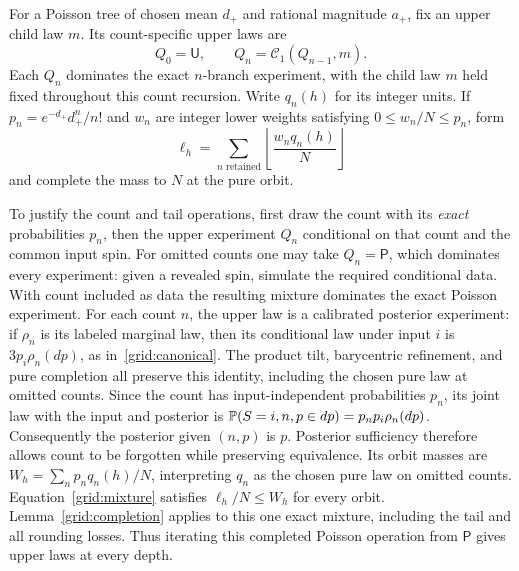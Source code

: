 For a Poisson tree of chosen mean $d_+$ and rational magnitude $a_+$,
fix an upper child law $m$.  Its count-specific upper laws are
\begin{equation}
 Q_0=\mathsf U,\qquad Q_n=\mathcal C_1(Q_{n-1},m).
 \label{grid:counts}
\end{equation}
Each $Q_n$ dominates the exact $n$-branch experiment, with the child law
$m$ held fixed throughout this count recursion.  Write $q_n(h)$ for its
integer units.  If $p_n=e^{-d_+}d_+^n/n!$ and $w_n$ are integer lower
weights satisfying $0\leq w_n/N\leq p_n$, form
\begin{equation}
 \ell_h=\sum_{n\text{ retained}}
          \left\lfloor\frac{w_nq_n(h)}N\right\rfloor
 \label{grid:mixture}
\end{equation}
and complete the mass to $N$ at the pure orbit.

To justify the count and tail operations, first draw the count with
its \emph{exact} probabilities $p_n$, then the upper experiment $Q_n$
conditional on that count and the common input spin.  For omitted counts
one may take $Q_n=\mathsf P$, which dominates every experiment: given a
revealed spin, simulate the required conditional data.  With count
included as data the resulting mixture dominates the exact Poisson
experiment.  For each count $n$, the upper law is a calibrated posterior experiment:
if $\rho_n$ is its labeled marginal law, then its conditional law under
input $i$ is $3p_i\rho_n(dp)$, as in~\eqref{grid:canonical}.
The product tilt, barycentric refinement, and pure completion all
preserve this identity, including the chosen pure law at omitted counts.
Since the count has input-independent probabilities $p_n$, its joint law
with the input and posterior is
$\mathbb P(S=i,n,p\in dp)=p_n p_i\rho_n(dp)$.
Consequently the posterior given $(n,p)$ is $p$. Posterior sufficiency
therefore allows count to be forgotten while preserving equivalence.  Its orbit masses are
$W_h=\sum_n p_nq_n(h)/N$, interpreting $q_n$ as the chosen pure law on
omitted counts.  Equation~\eqref{grid:mixture} satisfies
$\ell_h/N\leq W_h$ for every orbit.  Lemma~\ref{grid:completion} applies
to this one exact mixture, including the tail and all rounding losses.
Thus iterating this completed Poisson operation from $\mathsf P$ gives
upper laws at every depth.

